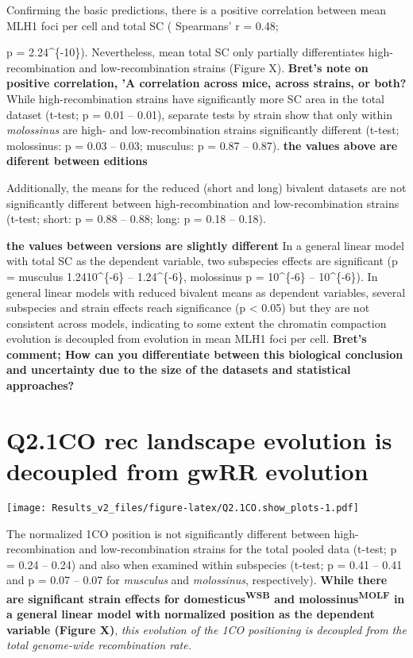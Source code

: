 \documentclass[]{article}
\begin{document}
Confirming the basic predictions, there is a positive correlation
between mean MLH1 foci per cell and total SC ( Spearmans' r = 0.48;

p = 2.24\^{}\{-10\}). Nevertheless, mean total SC only
partially differentiates high-recombination and low-recombination
strains (Figure X). \textbf{Bret's note on positive correlation, 'A
correlation across mice, across strains, or both?} While
high-recombination strains have significantly more SC area in the total
dataset (t-test; p = 0.01 -- 0.01), separate tests by strain show that
only within \emph{molossinus} are high- and low-recombination strains
significantly different (t-test; molossinus: p = 0.03 -- 0.03; musculus:
p = 0.87 -- 0.87). \textbf{the values above are diferent between
editions}

Additionally, the means for the reduced (short and long) bivalent
datasets are not significantly different between high-recombination and
low-recombination strains (t-test; short: p = 0.88 -- 0.88; long: p =
0.18 -- 0.18).

\textbf{the values between versions are slightly different} In a general
linear model with total SC as the dependent variable, two subspecies
effects are significant (p = musculus 1.2410\^{}\{-6\} --
1.24\^{}\{-6\}, molossinus p = 10\^{}\{-6\} -- 10\^{}\{-6\}).
In general linear models with reduced bivalent means as dependent
variables, several subspecies and strain effects reach significance (p
\textless{} 0.05) but they are not consistent across models, indicating
to some extent the chromatin compaction evolution is decoupled from
evolution in mean MLH1 foci per cell. \textbf{Bret's comment; How can
you differentiate between this biological conclusion and uncertainty due
to the size of the datasets and statistical approaches?}

\section{Q2.1CO rec landscape evolution is decoupled from gwRR
evolution}\label{q2.1co-rec-landscape-evolution-is-decoupled-from-gwrr-evolution}

\texttt{[image: Results\_v2\_files/figure-latex/Q2.1CO.show\_plots-1.pdf]}

The normalized 1CO position is not significantly different between
high-recombination and low-recombination strains for the total pooled
data (t-test; p = 0.24 -- 0.24) and also when examined within subspecies
(t-test; p = 0.41 -- 0.41 and p = 0.07 -- 0.07 for \emph{musculus} and
\emph{molossinus}, respectively). \textbf{While there are significant
strain effects for domesticus\textsuperscript{WSB} and
molossinus\textsuperscript{MOLF} in a general linear model with
normalized position as the dependent variable (Figure X)}, \emph{this
evolution of the 1CO positioning is decoupled from the total genome-wide
recombination rate.}
\end{document}

